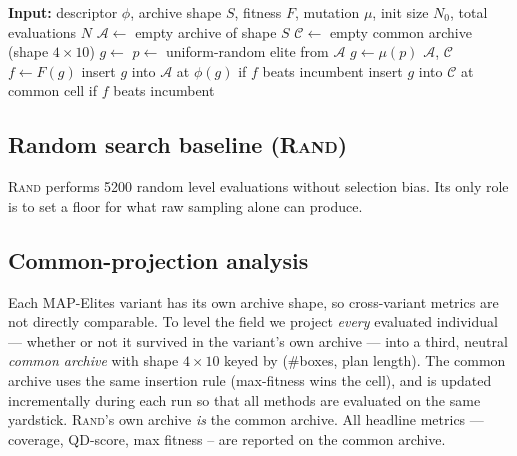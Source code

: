 \documentclass[conference]{IEEEtran}
\begin{document}
\begin{algorithm}[t]
\caption{MAP-Elites variant used in all conditions.}
\label{alg:me}
\begin{algorithmic}[1]
\State \textbf{Input:} descriptor $\phi$, archive shape $S$, fitness
$F$, mutation $\mu$, init size $N_0$, total evaluations $N$
\State $\mathcal{A} \gets$ empty archive of shape $S$
\State $\mathcal{C} \gets$ empty common archive (shape $4\times 10$)
 
    \State $g \gets$ 
    \State {}
\EndFor
{}
    \State $p \gets$ uniform-random elite from $\mathcal{A}$
    \State $g \gets \mu(p)$
    \State {}
\EndFor
\State \Return $\mathcal{A}$, $\mathcal{C}$
\Statex
{}
    \State $f \gets F(g)$ 
    \State insert $g$ into $\mathcal{A}$ at $\phi(g)$ if $f$ beats incumbent
    \State insert $g$ into $\mathcal{C}$ at common cell if $f$ beats incumbent
\EndProcedure
\end{algorithmic}
\end{algorithm}

\subsection{Random search baseline (\textsc{Rand})}

\textsc{Rand} performs 5200 random level evaluations without
selection bias. Its only role is to set a floor for what raw
sampling alone can produce.

\subsection{Common-projection analysis}
\label{sec:method-common}

Each MAP-Elites variant has its own archive shape, so cross-variant
metrics are not directly comparable. To level the field we project
\emph{every} evaluated individual --- whether or not it survived in
the variant's own archive --- into a third, neutral \emph{common
archive} with shape $4 \times 10$ keyed by (\#boxes, plan length).
The common archive uses the same insertion rule (max-fitness wins
the cell), and is updated incrementally during each run so that all
methods are evaluated on the same yardstick. \textsc{Rand}'s own
archive \emph{is} the common archive. All headline metrics ---
coverage, QD-score, max fitness -- are reported on the common
archive.
\end{document}

